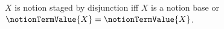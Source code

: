 

\begin{definition}\label{notion_staged_disjunction}
    $X$ is notion staged by disjunction iff
        $X$ is a notion base or
        $\notionTermValue{X}=\notionTermValue{X}$.
\end{definition}
